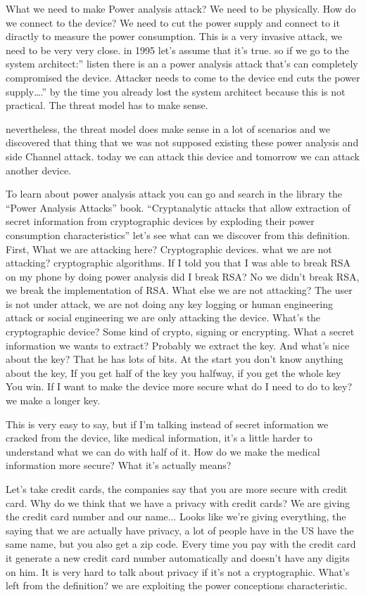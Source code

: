 \documentclass{report}
\begin{document}
What we need to make Power analysis attack? We need to be physically. 
How do we connect to the device? We need to cut the power supply and connect to it diractly to measure the power consumption.
This is a very invasive attack, we need to be very very close. in 1995 let's assume that it's true. so if we go to the system architect:” listen there is an a power analysis attack that's can completely compromised the device. Attacker needs to come to the device end cuts the power supply….” by the time you already lost the system architect because this is not practical. The threat model has to make sense.
 
nevertheless, the threat model does make sense in a lot of scenarios and we discovered that thing that we was not supposed existing these power analysis and side Channel attack.
today we can attack this device and tomorrow we can attack another device.

To learn about power analysis attack you can go and search in the library the “Power Analysis Attacks” book.
“Cryptanalytic attacks that allow extraction of secret information from cryptographic devices by exploding their power consumption characteristics”
 let's see what can we discover from this definition.
First, What we are attacking here? Cryptographic devices. what we are not attacking? cryptographic algorithms. If I told you that I was able to break RSA on my phone by doing power analysis did I break RSA? No we didn't break RSA, we break the implementation of RSA. 
What else we are not attacking? The user is not under attack, we are not doing any key logging or human engineering attack or social engineering we are only attacking the device.
What's the cryptographic device? Some kind of crypto, signing or encrypting.
What a secret information we wants to extract? Probably we extract the key.
And what's nice about the key? That he has lots of bits. At the start you don't know anything about the key, If you get half of the key you halfway, if you get the whole key You win. If I want to make the device more secure what do I need to do to key? we make a longer key.

This is very easy to say, but if I'm talking instead of secret information we cracked from the device, like medical information, it's a little harder to understand what we can do with half of it. How do we make the medical information more secure? What it's actually means?

Let's take credit cards, the companies say that you are more secure with credit card. Why do we think that we have a privacy with credit cards? We are giving the credit card number and our name... Looks like we're giving everything, the saying that we are actually have privacy, a lot of people have in the US have the same name, but you also get a zip code. Every time you pay with the credit card it generate a new credit card number automatically and doesn't have any digits on him. 
It is very hard to talk about privacy if it's not a cryptographic.
What's left from the definition? we are exploiting the power conceptions characteristic.
\end{document}
